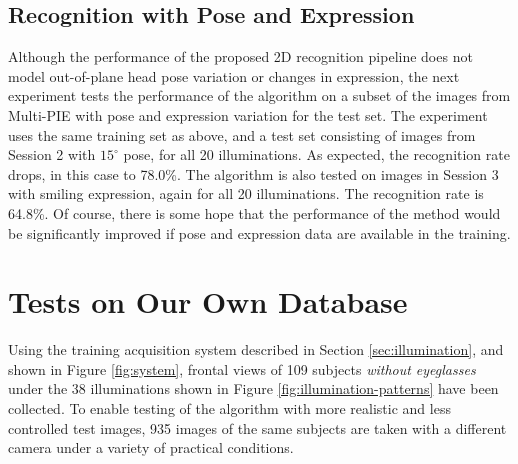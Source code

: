 \subsection{Recognition with Pose and Expression} Although the performance of
the proposed 2D recognition pipeline does not model out-of-plane head pose
variation or changes in expression, the next experiment tests the performance
of the algorithm on a subset of the images from Multi-PIE with pose and
expression variation for the test set.  The experiment uses the same training
set as above, and a test set consisting of images from Session 2 with
$15^\circ$ pose, for all 20 illuminations. As expected, the recognition rate
drops, in this case to 78.0\%. The algorithm is also tested on images in
Session 3 with smiling expression, again for all 20 illuminations. The
recognition rate is 64.8\%.  Of course, there is some hope that the
performance of the method would be significantly improved if pose and expression
data are available in the training.

\section{Tests on Our Own Database}\label{sec:own-data} Using the training
acquisition system described in Section \ref{sec:illumination}, and shown in
Figure \ref{fig:system}, frontal views of 109 subjects {\em without eyeglasses}
under the 38 illuminations shown in Figure \ref{fig:illumination-patterns} have
been collected. To enable testing of the algorithm with more realistic and less
controlled test images, 935 images of the same subjects are taken with a
different camera under a variety of practical conditions.


